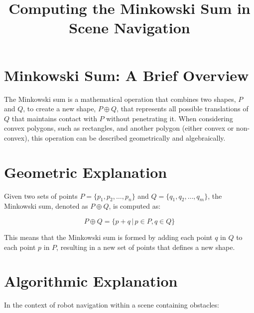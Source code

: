 \documentclass{article}
\begin{document}
\title{Computing the Minkowski Sum in Scene Navigation}
\maketitle

\section*{Minkowski Sum: A Brief Overview}

The Minkowski sum is a mathematical operation that combines two shapes, \(P\) and \(Q\), to create a new shape, \(P \oplus Q\), that represents all possible translations of \(Q\) that maintains contact with \(P\) without penetrating it. When considering convex polygons, such as rectangles, and another polygon (either convex or non-convex), this operation can be described geometrically and algebraically.

\section*{Geometric Explanation}

Given two sets of points \(P = \{p_1, p_2, \ldots, p_n\}\) and \(Q = \{q_1, q_2, \ldots, q_m\}\), the Minkowski sum, denoted as \(P \oplus Q\), is computed as:

\[
P \oplus Q = \{p + q \,|\, p \in P, q \in Q\}
\]

This means that the Minkowski sum is formed by adding each point \(q\) in \(Q\) to each point \(p\) in \(P\), resulting in a new set of points that defines a new shape.

\section*{Algorithmic Explanation}

In the context of robot navigation within a scene containing obstacles:
\end{document}
